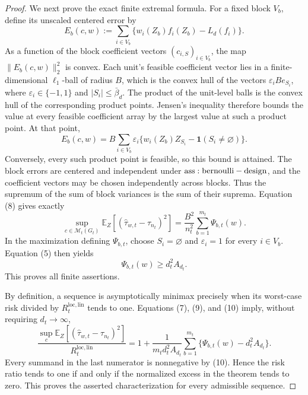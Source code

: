 \documentclass{article}
\begin{document}
\begin{proof}
We next prove the exact finite extremal formula. For a fixed block \(V_b\), define its unscaled centered error by
\[
E_b(c,w):=\sum_{i\in V_b}\{w_i(Z_b)f_i(Z_b)-L_d(f_i)\}.
\]
As a function of the block coefficient vectors \((c_{i,S})_{i\in V_b}\), the map \(\lVert E_b(c,w)\rVert_2^2\) is convex. Each unit's feasible coefficient vector lies in a finite-dimensional \(\ell_1\)-ball of radius \(B\), which is the convex hull of the vectors \(\varepsilon_iB e_{S_i}\), where \(\varepsilon_i\in\{-1,1\}\) and \(|S_i|\le\bar\beta_d\). The product of the unit-level balls is the convex hull of the corresponding product points. Jensen's inequality therefore bounds the value at every feasible coefficient array by the largest value at such a product point. At that point,
\[
E_b(c,w)=B\sum_{i\in V_b}\varepsilon_i
\{w_i(Z_b)Z_{S_i}-\mathbf1(S_i\ne\varnothing)\}.
\tag{8}
\]
Conversely, every such product point is feasible, so this bound is attained. The block errors are centered and independent under \({\rm ass:bernoulli-design}\), and the coefficient vectors may be chosen independently across blocks. Thus the supremum of the sum of block variances is the sum of their suprema. Equation (8) gives exactly
\[
\sup_{c\in\mathcal M_t(G_t)}
\mathbb E_Z[(\widehat\tau_{w,t}-\tau_{n_t})^2]
=\frac{B^2}{n_t^2}\sum_{b=1}^{m_t}\Psi_{b,t}(w).
\tag{9}
\]
In the maximization defining \(\Psi_{b,t}\), choose \(S_i=\varnothing\) and \(\varepsilon_i=1\) for every \(i\in V_b\). Equation (5) then yields
\[
\Psi_{b,t}(w)\ge d_t^2A_{d_t}.
\tag{10}
\]
This proves all finite assertions.

By definition, a sequence is asymptotically minimax precisely when its worst-case risk divided by \(R_t^{\mathrm{loc,lin}}\) tends to one. Equations (7), (9), and (10) imply, without requiring \(d_t\to\infty\),
\[
\frac{\sup_c\mathbb E_Z[(\widehat\tau_{w,t}-\tau_{n_t})^2]}
{R_t^{\mathrm{loc,lin}}}
=1+\frac{1}{m_td_t^2A_{d_t}}
\sum_{b=1}^{m_t}\{\Psi_{b,t}(w)-d_t^2A_{d_t}\}.
\tag{11}
\]
Every summand in the last numerator is nonnegative by (10). Hence the risk ratio tends to one if and only if the normalized excess in the theorem tends to zero. This proves the asserted characterization for every admissible sequence.


\end{proof}
\end{document}
